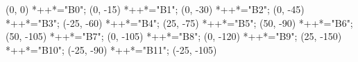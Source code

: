 \begin{scriptsize}
\xy(0, 0)
	*++{}*\frm{-,}="B0";
(0, -15)
	*++{}*\frm{-,}="B1";
(0, -30)
	*++{}*\frm{-,}="B2";
(0, -45)
	*++{}*\frm{-,}="B3";
(-25, -60)
	*++{}*\frm{-,}="B4";
(25, -75)
	*++{}*\frm{-,}="B5";
(50, -90)
	*++{}*\frm{-,}="B6";
(50, -105)
	*++{}*\frm{-,}="B7";
(0, -105)
	*++{}*\frm{-,}="B8";
(0, -120)
	*++{}*\frm{-,}="B9";
(25, -150)
	*++{}*\frm{-,}="B10";
(-25, -90)
	*++{}*\frm{-,}="B11";
(-25, -105)

\end{scriptsize}
